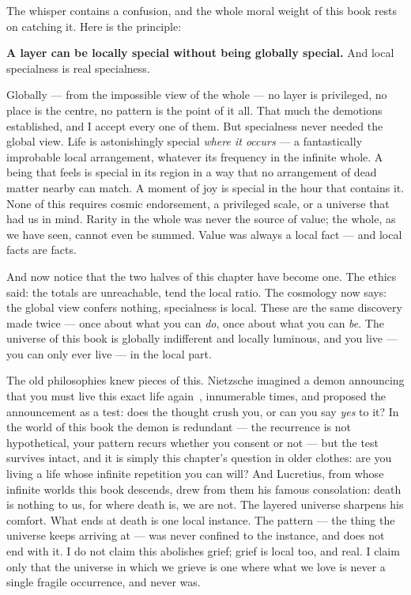 \documentclass[fontsize=11pt,paper=a4,pagesize=auto,parskip=half-]{scrbook}
\begin{document}
The whisper contains a confusion, and the whole moral weight of this book rests on catching it. Here is the principle:

\textbf{A layer can be locally special without being globally special.} And local specialness is real specialness.

Globally --- from the impossible view of the whole --- no layer is privileged, no place is the centre, no pattern is the point of it all. That much the demotions established, and I accept every one of them. But specialness never needed the global view. Life is astonishingly special \emph{where it occurs} --- a fantastically improbable local arrangement, whatever its frequency in the infinite whole. A being that feels is special in its region in a way that no arrangement of dead matter nearby can match. A moment of joy is special in the hour that contains it. None of this requires cosmic endorsement, a privileged scale, or a universe that had us in mind. Rarity in the whole was never the source of value; the whole, as we have seen, cannot even be summed. Value was always a local fact --- and local facts are facts.

And now notice that the two halves of this chapter have become one. The ethics said: the totals are unreachable, tend the local ratio. The cosmology now says: the global view confers nothing, specialness is local. These are the same discovery made twice --- once about what you can \emph{do}, once about what you can \emph{be}. The universe of this book is globally indifferent and locally luminous, and you live --- you can only ever live --- in the local part.

The old philosophies knew pieces of this. Nietzsche imagined a demon announcing that you must live this exact life again~\cite{nietzsche1974}, innumerable times, and proposed the announcement as a test: does the thought crush you, or can you say \emph{yes} to it? In the world of this book the demon is redundant --- the recurrence is not hypothetical, your pattern recurs whether you consent or not --- but the test survives intact, and it is simply this chapter's question in older clothes: are you living a life whose infinite repetition you can will? And Lucretius, from whose infinite worlds this book descends, drew from them his famous consolation: death is nothing to us, for where death is, we are not. The layered universe sharpens his comfort. What ends at death is one local instance. The pattern --- the thing the universe keeps arriving at --- was never confined to the instance, and does not end with it. I do not claim this abolishes grief; grief is local too, and real. I claim only that the universe in which we grieve is one where what we love is never a single fragile occurrence, and never was.
\end{document}
